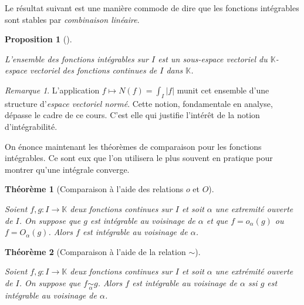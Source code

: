 \documentclass[
  french,
  letterpaper,
  DIV=11,
  numbers=noendperiod]{scrreprt}
\theoremstyle{plain}
\theoremstyle{definition}
\theoremstyle{plain}
\newtheorem{proposition}{Proposition}[chapter]
\theoremstyle{plain}
\newtheorem{theorem}{Théorème}[chapter]
\theoremstyle{definition}
\theoremstyle{definition}
\theoremstyle{plain}
\theoremstyle{remark}
\newtheorem{refremark}{Remarque}[chapter]
\begin{document}
Le résultat suivant est une manière commode de dire que les fonctions
intégrables sont stables par \emph{combinaison linéaire}.

\begin{proposition}[]\protect\hypertarget{prp-espace-vectoriel-fonction-integrable}{}\label{prp-espace-vectoriel-fonction-integrable}

L'ensemble des fonctions intégrables sur \(I\) est un sous-espace
vectoriel du \(\mathbb{K}\)-espace vectoriel des fonctions continues de
\(I\) dans \(\mathbb{K}\).

\end{proposition}

\begin{refremark}
L'application \(f \mapsto N(f) = \int_I|f|\) munit cet ensemble d'une
structure d'\emph{espace vectoriel normé}. Cette notion, fondamentale en
analyse, dépasse le cadre de ce cours. C'est elle qui justifie l'intérêt
de la notion d'intégrabilité.

\label{rem-espace-norme}

\end{refremark}

On énonce maintenant les théorèmes de comparaison pour les fonctions
intégrables. Ce sont eux que l'on utilisera le plus souvent en pratique
pour montrer qu'une intégrale converge.

\begin{theorem}[Comparaison à l'aide des relations \(o\) et
\(O\)]\protect\hypertarget{thm-theoreme-de-comparaison-o}{}\label{thm-theoreme-de-comparaison-o}

Soient \(f,g:I \to \mathbb{K}\) deux fonctions continues sur \(I\) et
soit \(\alpha\) une extremité ouverte de \(I\). On suppose que \(g\) est
intégrable au voisinage de \(\alpha\) et que \(f = o_{\alpha}(g)\) ou
\(f=O_{\alpha}(g)\). Alors \(f\) est intégrable au voisinage de
\(\alpha\).

\end{theorem}

\begin{theorem}[Comparaison à l'aide de la relation
\(\sim\)]\protect\hypertarget{thm-theorem-comparaison-equiv}{}\label{thm-theorem-comparaison-equiv}

Soient \(f,g:I \to \mathbb{K}\) deux fonctions continues sur \(I\) et
soit \(\alpha\) une extrémité ouverte de \(I\). On suppose que
\(f \underset{\alpha}{\sim} g\). Alors \(f\) est intégrable au voisinage
de \(\alpha\) ssi \(g\) est intégrable au voisinage de \(\alpha\).

\end{theorem}
\end{document}
